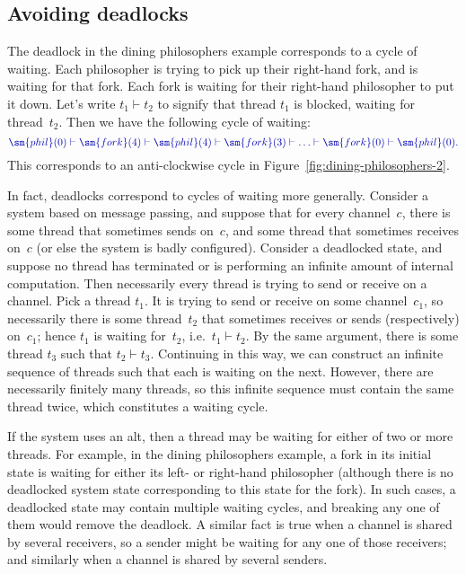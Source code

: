 
\subsection{Avoiding deadlocks}
\label{sec:avoid-deadlocks}

\def\waitingFor{\vdash}

The deadlock in the dining philosophers example corresponds to a cycle of
waiting.  Each philosopher is trying to pick up their right-hand fork, and is
waiting for that fork.  Each fork is waiting for their right-hand philosopher
to put it down.  Let's write $t_1 \waitingFor t_2$ to signify that thread
$t_1$ is blocked, waiting for thread~$t_2$.  Then we have the following cycle
of waiting:
\[\mstyle
\sm{phil}(0) \waitingFor \sm{fork}(4) \waitingFor \sm{phil}(4) \waitingFor
  \sm{fork}(3) \waitingFor \ldots \waitingFor \sm{fork}(0) \waitingFor
  \sm{phil}(0).
\]
This corresponds to an anti-clockwise cycle in
Figure~\ref{fig:dining-philosophers-2}.

In fact, deadlocks correspond to cycles of waiting more generally.  Consider a
system based on message passing, and suppose that for every channel~$c$, there
is some thread that sometimes sends on~$c$, and some thread that sometimes
receives on~$c$ (or else the system is badly configured).  Consider a
deadlocked state, and suppose no thread has terminated or is performing an
infinite amount of internal computation.  Then necessarily every thread is
trying to send or receive on a channel.  Pick a thread $t_1$.  It is trying to
send or receive on some channel~$c_1$, so necessarily there is some
thread~$t_2$ that sometimes receives or sends (respectively) on~$c_1$; hence
$t_1$ is waiting for~$t_2$, i.e.~$t_1 \waitingFor t_2$.  By the same argument,
there is some thread $t_3$ such that $t_2 \waitingFor t_3$.  Continuing in
this way, we can construct an infinite sequence of threads such that each is
waiting on the next.  However, there are necessarily finitely many threads, so
this infinite sequence must contain the same thread twice, which constitutes a
waiting cycle.

If the system uses an alt, then a thread may be waiting for either of two or
more threads.  For example, in the dining philosophers example, a fork in its
initial state is waiting for either its left- or right-hand philosopher
(although there is no deadlocked system state corresponding to this state for
the fork).  In such cases, a deadlocked state may contain multiple waiting
cycles, and breaking any one of them would remove the deadlock.  A similar
fact is true when a channel is shared by several receivers, so a sender might
be waiting for any one of those receivers; and similarly when a channel is
shared by several senders.

